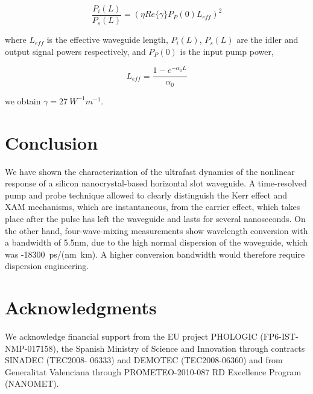 \documentclass[conference]{IEEEtran}
\begin{document}
\begin{equation}
	\frac{P_i(L)}{P_s(L)}=(\eta Re\{\gamma\}P_P(0)L_{eff})^2  \nonumber	
\end{equation}

where $ L_{eff} $ is the effective waveguide length, $ P_i(L) $, $ P_s(L) $ are the idler and output signal powers respectively, and $ P_P(0) $ is the input pump power,

\begin{equation}
	L_{eff}=\frac{1-e^{-\alpha_0L}}{\alpha_0}  \nonumber	
\end{equation}


we obtain $\gamma=27~W^{-1}m^{-1}$.


\section{Conclusion}
We have shown the characterization of the ultrafast dynamics of the nonlinear response of a silicon nanocrystal-based horizontal slot waveguide. A time-resolved pump and probe technique allowed to clearly distinguish the Kerr effect and XAM mechanisms, which are instantaneous, from the carrier effect, which takes place after the pulse has left the waveguide and lasts for several nanoseconds. On the other hand, four-wave-mixing measurements show wavelength conversion with a bandwidth of 5.5nm, due to the high normal dispersion of the waveguide, which was -18300~ps/(nm~km). A higher conversion bandwidth would therefore require dispersion engineering. 


\section*{Acknowledgments}

We acknowledge financial support from the EU project PHOLOGIC (FP6-IST-NMP-017158), the Spanish Ministry of Science and Innovation through contracts SINADEC (TEC2008- 06333) and DEMOTEC (TEC2008-06360) and from Generalitat Valenciana through PROMETEO-2010-087 RD Excellence Program (NANOMET).



\end{document}
